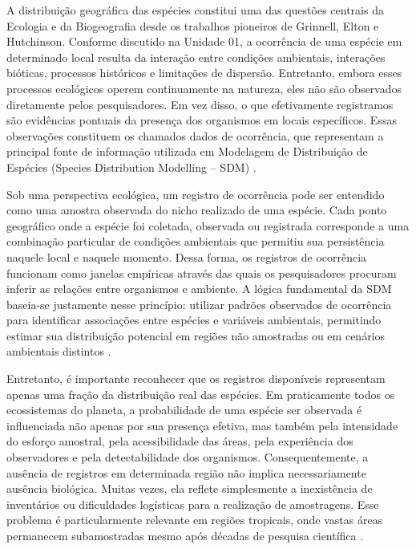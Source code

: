 A distribuição geográfica das espécies constitui uma das questões centrais da Ecologia e da Biogeografia desde os trabalhos pioneiros de Grinnell, Elton e Hutchinson. Conforme discutido na Unidade 01, a ocorrência de uma espécie em determinado local resulta da interação entre condições ambientais, interações bióticas, processos históricos e limitações de dispersão. Entretanto, embora esses processos ecológicos operem continuamente na natureza, eles não são observados diretamente pelos pesquisadores. Em vez disso, o que efetivamente registramos são evidências pontuais da presença dos organismos em locais específicos. Essas observações constituem os chamados dados de ocorrência, que representam a principal fonte de informação utilizada em Modelagem de Distribuição de Espécies (Species Distribution Modelling – SDM) \parencite{grinnell1917field,hutchinson1957concluding,peterson2011ecological}.

Sob uma perspectiva ecológica, um registro de ocorrência pode ser entendido como uma amostra observada do nicho realizado de uma espécie. Cada ponto geográfico onde a espécie foi coletada, observada ou registrada corresponde a uma combinação particular de condições ambientais que permitiu sua persistência naquele local e naquele momento. Dessa forma, os registros de ocorrência funcionam como janelas empíricas através das quais os pesquisadores procuram inferir as relações entre organismos e ambiente. A lógica fundamental da SDM baseia-se justamente nesse princípio: utilizar padrões observados de ocorrência para identificar associações entre espécies e variáveis ambientais, permitindo estimar sua distribuição potencial em regiões não amostradas ou em cenários ambientais distintos \parencite{elith2009species,franklin2010mapping}.

Entretanto, é importante reconhecer que os registros disponíveis representam apenas uma fração da distribuição real das espécies. Em praticamente todos os ecossistemas do planeta, a probabilidade de uma espécie ser observada é influenciada não apenas por sua presença efetiva, mas também pela intensidade do esforço amostral, pela acessibilidade das áreas, pela experiência dos observadores e pela detectabilidade dos organismos. Consequentemente, a ausência de registros em determinada região não implica necessariamente ausência biológica. Muitas vezes, ela reflete simplesmente a inexistência de inventários ou dificuldades logísticas para a realização de amostragens. Esse problema é particularmente relevante em regiões tropicais, onde vastas áreas permanecem subamostradas mesmo após décadas de pesquisa científica \parencite{soberon2007grinnellian,guisan2017habitat}.

